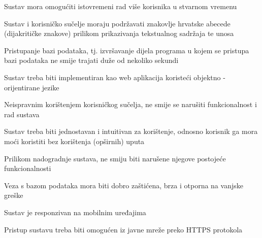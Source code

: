 			 \begin{packed_item}
				\item Sustav mora omogućiti istovremeni rad više korisnika u stvarnom vremenu
				\item Sustav i korisničko sučelje moraju podržavati znakovlje hrvatske abecede (dijakritičke znakove) prilikom prikazivanja tekstualnog sadržaja te unosa
				\item Pristupanje bazi podataka, tj. izvršavanje dijela programa u kojem se pristupa bazi podataka ne smije trajati duže od nekoliko sekundi
				\item Sustav treba biti implementiran kao web aplikacija koristeći objektno - orijentirane jezike
				\item Neispravnim korištenjem korisničkog sučelja, ne smije se narušiti funkcionalnost i rad sustava
				\item Sustav treba biti jednostavan i intuitivan za korištenje, odnosno korisnik ga mora moći koristiti bez korištenja (opširnih) uputa
				\item Prilikom nadogradnje sustava, ne smiju biti narušene njegove postojeće funkcionalnosti
				\item Veza s bazom podataka mora biti dobro zaštićena, brza i otporna na vanjske greške
				\item Sustav je responzivan na mobilnim uređajima
				\item Pristup sustavu treba biti omogućen iz javne mreže preko HTTPS protokola
			\end{packed_item}
			 
			 
			 
	